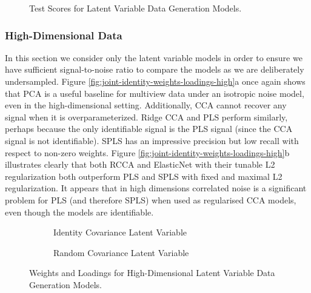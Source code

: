 \begin{figure}
\centering
\begin{subfigure}{0.49\linewidth}
\centering

\caption{}
\end{subfigure}
%
\begin{subfigure}{0.49\linewidth}
\centering

\caption{}
\end{subfigure}
\caption{Test Scores for Latent Variable Data Generation Models.}
\label{fig:latent-variable-scores}
\end{figure}

\subsubsection{High-Dimensional Data}
In this section we consider only the latent variable models in order to ensure we have sufficient signal-to-noise ratio to compare the models as we are deliberately undersampled.
Figure \ref{fig:joint-identity-weights-loadings-high}a once again shows that PCA is a useful baseline for multiview data under an isotropic noise model, even in the high-dimensional setting.
Additionally, CCA cannot recover any signal when it is overparameterized.
Ridge CCA and PLS perform similarly, perhaps because the only identifiable signal is the PLS signal (since the CCA signal is not identifiable).
SPLS has an impressive precision but low recall with respect to non-zero weights.
Figure \ref{fig:joint-identity-weights-loadings-high}b illustrates clearly that both RCCA and ElasticNet with their tunable L2 regularization both outperform PLS and SPLS with fixed and maximal L2 regularization.
It appears that in high dimensions correlated noise is a significant problem for PLS (and therefore SPLS) when used as regularised CCA models, even though the models are identifiable.

\begin{figure}
\centering
\begin{subfigure}{0.49\linewidth}
\centering

\caption{Identity Covariance Latent Variable}
\end{subfigure}
%
\begin{subfigure}{0.49\linewidth}
\centering

\caption{Random Covariance Latent Variable}
\end{subfigure}
\caption{Weights and Loadings for High-Dimensional Latent Variable Data Generation Models.}
    \label{fig:latent-variable-weights-loadings-high}
\end{figure}

